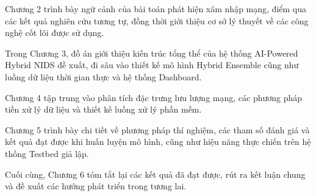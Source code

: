 \documentclass[../DoAn.tex]{subfiles}
\begin{document}
Chương 2 trình bày ngữ cảnh của bài toán phát hiện xâm nhập mạng, điểm qua các kết quả nghiên cứu tương tự, đồng thời giới thiệu cơ sở lý thuyết về các công nghệ cốt lõi được sử dụng.

Trong Chương 3, đồ án giới thiệu kiến trúc tổng thể của hệ thống AI-Powered Hybrid NIDS đề xuất, đi sâu vào thiết kế mô hình Hybrid Ensemble cũng như luồng dữ liệu thời gian thực và hệ thống Dashboard.

Chương 4 tập trung vào phân tích đặc trưng lưu lượng mạng, các phương pháp tiền xử lý dữ liệu và thiết kế luồng xử lý phần mềm.

Chương 5 trình bày chi tiết về phương pháp thí nghiệm, các tham số đánh giá và kết quả đạt được khi huấn luyện mô hình, cũng như hiệu năng thực chiến trên hệ thống Testbed giả lập.

Cuối cùng, Chương 6 tóm tắt lại các kết quả đã đạt được, rút ra kết luận chung và đề xuất các hướng phát triển trong tương lai.
\end{document}
